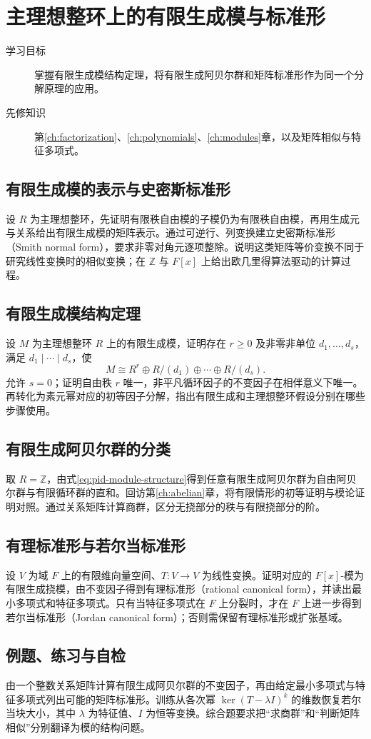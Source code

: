 \setcounter{chapter}{20} %
\chapter{主理想整环上的有限生成模与标准形}\label{ch:pid-modules}

\begin{description}
  \item[学习目标] 掌握有限生成模结构定理，将有限生成阿贝尔群和矩阵标准形作为同一个分解原理的应用。
  \item[先修知识] 第\ref{ch:factorization}、\ref{ch:polynomials}、\ref{ch:modules}章，以及矩阵相似与特征多项式。
\end{description}

\section{有限生成模的表示与史密斯标准形}
设 $R$ 为主理想整环，先证明有限秩自由模的子模仍为有限秩自由模，再用生成元与关系给出有限生成模的矩阵表示。通过可逆行、列变换建立史密斯标准形（Smith normal form），要求非零对角元逐项整除。说明这类矩阵等价变换不同于研究线性变换时的相似变换；在 $\mathbb Z$ 与 $F[x]$ 上给出欧几里得算法驱动的计算过程。

\section{有限生成模结构定理}
设 $M$ 为主理想整环 $R$ 上的有限生成模，证明存在 $r\geq0$ 及非零非单位 $d_1,\ldots,d_s$，满足 $d_1\mid\cdots\mid d_s$，使
\begin{equation}\label{eq:pid-module-structure}
  M\cong R^r\oplus R/(d_1)\oplus\cdots\oplus R/(d_s).
\end{equation}
允许 $s=0$；证明自由秩 $r$ 唯一，非平凡循环因子的不变因子在相伴意义下唯一。再转化为素元幂对应的初等因子分解，指出有限生成和主理想整环假设分别在哪些步骤使用。

\section{有限生成阿贝尔群的分类}
取 $R=\mathbb Z$，由式\eqref{eq:pid-module-structure}得到任意有限生成阿贝尔群为自由阿贝尔群与有限循环群的直和。回访第\ref{ch:abelian}章，将有限情形的初等证明与模论证明对照。通过关系矩阵计算商群，区分无挠部分的秩与有限挠部分的阶。

\section{有理标准形与若尔当标准形}
设 $V$ 为域 $F$ 上的有限维向量空间、$T:V\to V$ 为线性变换。证明对应的 $F[x]$-模为有限生成挠模，由不变因子得到有理标准形（rational canonical form），并读出最小多项式和特征多项式。只有当特征多项式在 $F$ 上分裂时，才在 $F$ 上进一步得到若尔当标准形（Jordan canonical form）；否则需保留有理标准形或扩张基域。

\section{例题、练习与自检}
由一个整数关系矩阵计算有限生成阿贝尔群的不变因子，再由给定最小多项式与特征多项式列出可能的矩阵标准形。训练从各次幂 $\ker(T-\lambda I)^k$ 的维数恢复若尔当块大小，其中 $\lambda$ 为特征值、$I$ 为恒等变换。综合题要求把“求商群”和“判断矩阵相似”分别翻译为模的结构问题。

